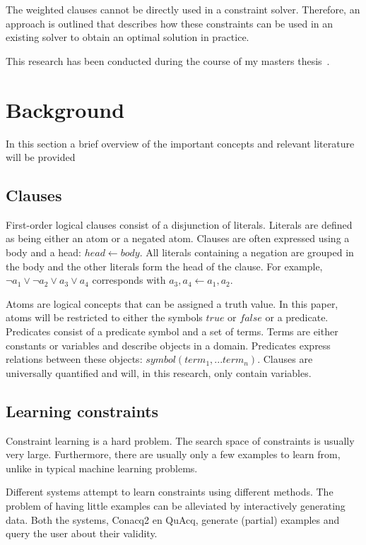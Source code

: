 \documentclass{llncs}
\begin{document}
The weighted clauses cannot be directly used in a constraint solver.
Therefore, an approach is outlined that describes how these constraints can be used in an existing solver to obtain an optimal solution in practice.

This research has been conducted during the course of my masters thesis~\cite{kolb2015thesis}.
\section{Background}
In this section a brief overview of the important concepts and relevant literature will be provided

\subsection{Clauses}
First-order logical clauses consist of a disjunction of literals.
Literals are defined as being either an atom or a negated atom.
Clauses are often expressed using a body and a head: $\mathit{head} \leftarrow \mathit{body}$.
All literals containing a negation are grouped in the body and the other literals form the head of the clause.
For example, $\lnot a_1 \lor \lnot a_2 \lor a_3 \lor a_4$ corresponds with $a_3, a_4 \leftarrow a_1, a_2$.

Atoms are logical concepts that can be assigned a truth value.
In this paper, atoms will be restricted to either the symbols $\mathit{true}$ or $\mathit{false}$ or a predicate.
Predicates consist of a predicate symbol and a set of terms.
Terms are either constants or variables and describe objects in a domain.
Predicates express relations between these objects: $\mathit{symbol}(\mathit{term_1}, ... \mathit{term_n})$.
Clauses are universally quantified and will, in this research, only contain variables.

\subsection{Learning constraints}
Constraint learning is a hard problem.
The search space of constraints is usually very large.
Furthermore, there are usually only a few examples to learn from, unlike in typical machine learning problems.

Different systems attempt to learn constraints using different methods.
The problem of having little examples can be alleviated by interactively generating data.
Both the systems, Conacq2\cite{bessiere2007query} en QuAcq\cite{bessiere2013constraint}, generate (partial) examples and query the user about their validity.
\end{document}
